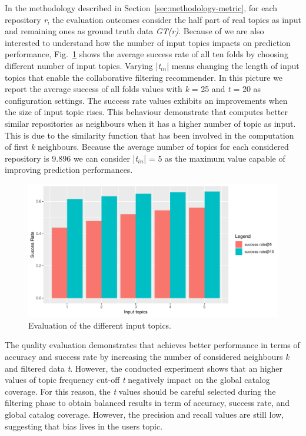 In the methodology described in Section~\ref{sec:methodology-metric}, for each repository \emph{r}, the evaluation outcomes consider the half part of real topics as input and remaining ones as ground truth data \emph{GT(r)}. Because of we are also interested to understand how the number of input topics impacts on prediction performance, Fig.~\ref{fig:pr-input-topics} shows the average success rate of all ten folds by choosing different number of input topics. Varying |\emph{t$_{in}$}| means changing the length of input topics that enable the \CT collaborative filtering recommender. In this picture we report the average success of all folds values with \emph{k} = 25 and \emph{t} = 20 as configuration settings. The success rate values exhibits an improvements when the size of input topic rises. This  behaviour demonstrate that \CT computes better similar repositories as neighbours when it has a higher number of topic as input. This is due to the similarity function that has been involved in the computation of first  \emph{k} neighbours. Because the average number of topics for each considered repository is 9.896 we can consider |\emph{t$_{in}$}| = 5 as the maximum value capable of improving prediction performances.
\begin{figure}[t!]
	\centering
	\includegraphics[width=\linewidth]{figs/sr_change_input_topics.pdf}
	\caption{Evaluation of the different input topics.}
	\label{fig:pr-input-topics}
\end{figure} 



\begin{tcolorbox}[boxrule=0.86pt,left=0.3em, right=0.3em,top=0.1em, bottom=0.05em]
The quality evaluation demonstrates that \CT achieves better performance in terms of accuracy and success rate by increasing the number of considered neighbours \emph{k} and filtered data \emph{t}. %
However, the conducted experiment shows that an higher values of topic frequency cut-off \emph{t} negatively impact on the global catalog coverage. 
For this reason, the \emph{t} values should be careful selected during the filtering phase to obtain balanced results in term of accuracy, success rate, and global catalog coverage.
However, the precision and recall values are still low, suggesting that bias lives in the users topic.
\end{tcolorbox}


